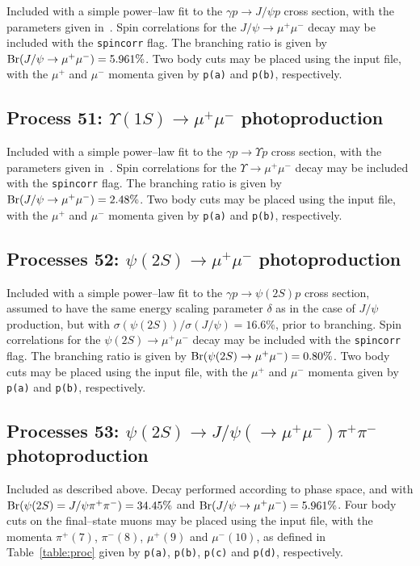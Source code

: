 \documentclass[12pt]{article}
\begin{document}
Included with a simple power--law fit to the $\gamma p\to J/\psi p$ cross section, with the parameters given in~\cite{Harland-Lang:2015cta}. 
Spin correlations for the $J/\psi\to \mu^+\mu^-$ decay may be included with the \texttt{spincorr} flag. The branching ratio is given by 
${\rm Br}(J/\psi \to \mu^+\mu^-)=5.961\%$. Two body cuts may be placed using the input file, with the $\mu^+$ and $\mu^-$  momenta given by 
\texttt{p(a)} and \texttt{p(b)}, respectively.

\subsection{Process 51: $\Upsilon(1S) \to \mu^+\mu^-$ photoproduction}

Included with a simple power--law fit to the $\gamma p\to \Upsilon p$ cross section, with the parameters given in~\cite{Harland-Lang:2015cta}. 
Spin correlations for the $\Upsilon\to \mu^+\mu^-$ decay may be included with the \texttt{spincorr} flag. The branching ratio is given by 
${\rm Br}(J/\psi \to \mu^+\mu^-)=2.48\%$. Two body cuts may be placed using the input file, with the $\mu^+$ and $\mu^-$  momenta given by 
\texttt{p(a)} and \texttt{p(b)}, respectively.

\subsection{Processes 52: $\psi(2S)\to \mu^+\mu^-$ photoproduction}

Included with a simple power--law fit to the $\gamma p\to \psi(2S) p$ cross section, assumed to have the same energy scaling parameter $\delta$ 
as in the case of $J/\psi$ production, but with $\sigma(\psi(2S))/\sigma(J/\psi)=16.6\%$, prior to branching. Spin correlations for the
 $\psi(2S)\to \mu^+\mu^-$ decay may be included with the \texttt{spincorr} flag. The branching ratio is given by 
 ${\rm Br}(\psi(2S) \to \mu^+\mu^-)=0.80\%$. Two body cuts may be placed using the input file, with the $\mu^+$ and $\mu^-$ momenta given by 
 \texttt{p(a)} and \texttt{p(b)}, respectively.

\subsection{Processes 53: $\psi(2S)\to J/\psi(\to \mu^+\mu^-) \pi^+\pi^-$ photoproduction}

Included as described above. Decay performed according to phase space, and with ${\rm Br}(\psi(2S)=J/\psi\pi^+\pi^-)=34.45\%$ and 
${\rm Br}(J/\psi \to \mu^+\mu^-)=5.961\%$. Four body cuts on the final--state muons may be placed using the input file, with the momenta 
$\pi^+(7)$, $\pi^-(8)$, $\mu^+(9)$ and $\mu^-(10)$, as defined in Table~\ref{table:proc} given by \texttt{p(a)}, \texttt{p(b)}, \texttt{p(c)} 
and \texttt{p(d)}, respectively.
\end{document}
